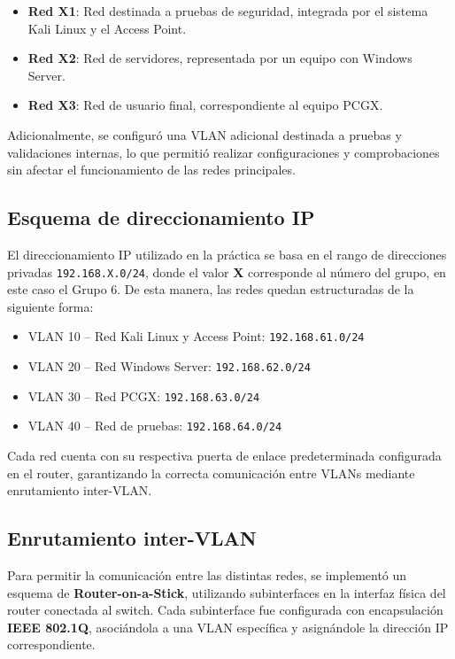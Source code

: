 \begin{itemize}
    \item \textbf{Red X1}: Red destinada a pruebas de seguridad, integrada por el sistema Kali Linux y el Access Point.
    \item \textbf{Red X2}: Red de servidores, representada por un equipo con Windows Server.
    \item \textbf{Red X3}: Red de usuario final, correspondiente al equipo PCGX.
\end{itemize}

Adicionalmente, se configuró una VLAN adicional destinada a pruebas y validaciones internas, lo que permitió realizar configuraciones y comprobaciones sin afectar el funcionamiento de las redes principales.

\subsection{Esquema de direccionamiento IP}

El direccionamiento IP utilizado en la práctica se basa en el rango de direcciones privadas \texttt{192.168.X.0/24}, donde el valor \textbf{X} corresponde al número del grupo, en este caso el Grupo 6. De esta manera, las redes quedan estructuradas de la siguiente forma:

\begin{itemize}
    \item VLAN 10 – Red Kali Linux y Access Point: \texttt{192.168.61.0/24}
    \item VLAN 20 – Red Windows Server: \texttt{192.168.62.0/24}
    \item VLAN 30 – Red PCGX: \texttt{192.168.63.0/24}
    \item VLAN 40 – Red de pruebas: \texttt{192.168.64.0/24}
\end{itemize}

Cada red cuenta con su respectiva puerta de enlace predeterminada configurada en el router, garantizando la correcta comunicación entre VLANs mediante enrutamiento inter-VLAN.

\subsection{Enrutamiento inter-VLAN}

Para permitir la comunicación entre las distintas redes, se implementó un esquema de \textbf{Router-on-a-Stick}, utilizando subinterfaces en la interfaz física del router conectada al switch. Cada subinterface fue configurada con encapsulación \textbf{IEEE 802.1Q}, asociándola a una VLAN específica y asignándole la dirección IP correspondiente.

